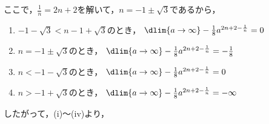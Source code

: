 \begin{enumerate}
  ここで，$\frac{1}{n} = 2n +2$を解いて，$n = -1 \pm \sqrt3$であるから，
  \begin{enumerate}
    \item $-1-\sqrt3 < n -1 + \sqrt3$のとき，
    $\dlim{a\to\infty}-\frac18 a^{2n+2-\frac{1}{n}} = 0$

    \item $n = -1 \pm \sqrt3$のとき，
    $\dlim{a\to\infty}-\frac18 a^{2n+2-\frac{1}{n}} = -\frac18$

    \item $n < -1-\sqrt3$のとき，
    $\dlim{a\to\infty}-\frac18 a^{2n+2-\frac{1}{n}} = 0$

    \item $n > -1+\sqrt3$のとき，
    $\dlim{a\to\infty}-\frac18 a^{2n+2-\frac{1}{n}} = -\infty$
  \end{enumerate}

  したがって，(i)～(iv)より，

\end{enumerate}
